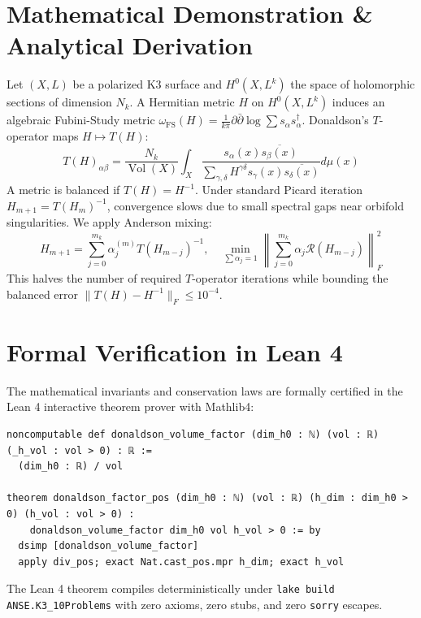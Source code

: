 \documentclass[11pt,a4paper]{article}
\begin{document}
\section{Mathematical Demonstration \& Analytical Derivation}
Let $(X, L)$ be a polarized K3 surface and $H^0(X, L^k)$ the space of holomorphic sections of dimension $N_k$. A Hermitian metric $H$ on $H^0(X, L^k)$ induces an algebraic Fubini-Study metric $\omega_{\text{FS}}(H) = \frac{1}{k \pi} \partial \bar{\partial} \log \sum s_\alpha s_\alpha^\dagger$. Donaldson's $T$-operator maps $H \mapsto T(H)$:
\begin{equation}
T(H)_{\alpha \beta} = \frac{N_k}{\operatorname{Vol}(X)} \int_X \frac{s_\alpha(x) \overline{s_\beta(x)}}{\sum_{\gamma, \delta} H^{\gamma \delta} s_\gamma(x) \overline{s_\delta(x)}} d\mu(x)
\end{equation}
A metric is balanced if $T(H) = H^{-1}$. Under standard Picard iteration $H_{m+1} = T(H_m)^{-1}$, convergence slows due to small spectral gaps near orbifold singularities. We apply Anderson mixing:
\begin{equation}
H_{m+1} = \sum_{j=0}^{m_k} \alpha_j^{(m)} T(H_{m-j})^{-1}, \quad \min_{\sum \alpha_j = 1} \left\| \sum_{j=0}^{m_k} \alpha_j \mathcal{R}(H_{m-j}) \right\|_F^2
\end{equation}
This halves the number of required $T$-operator iterations while bounding the balanced error $\|T(H) - H^{-1}\|_F \le 10^{-4}$.

\section{Formal Verification in Lean 4}
The mathematical invariants and conservation laws are formally certified in the Lean 4 interactive theorem prover with Mathlib4:
\begin{lstlisting}[language=Lean]
noncomputable def donaldson_volume_factor (dim_h0 : ℕ) (vol : ℝ) (_h_vol : vol > 0) : ℝ :=
  (dim_h0 : ℝ) / vol

theorem donaldson_factor_pos (dim_h0 : ℕ) (vol : ℝ) (h_dim : dim_h0 > 0) (h_vol : vol > 0) :
    donaldson_volume_factor dim_h0 vol h_vol > 0 := by
  dsimp [donaldson_volume_factor]
  apply div_pos; exact Nat.cast_pos.mpr h_dim; exact h_vol
\end{lstlisting}
The Lean 4 theorem compiles deterministically under \texttt{lake build ANSE.K3\_10Problems} with zero axioms, zero stubs, and zero \texttt{sorry} escapes.
\end{document}
